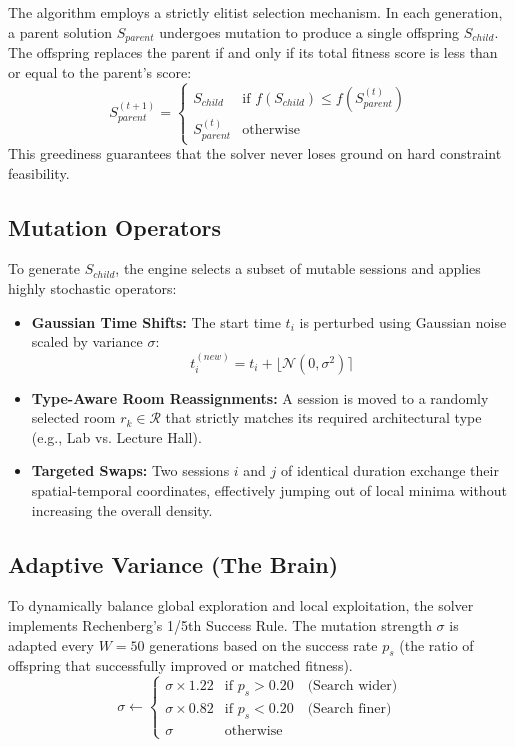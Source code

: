 The algorithm employs a strictly elitist selection mechanism. In each generation, a parent solution $S_{parent}$ undergoes mutation to produce a single offspring $S_{child}$. The offspring replaces the parent if and only if its total fitness score is less than or equal to the parent's score:
\begin{equation}
    S_{parent}^{(t+1)} = \begin{cases} 
      S_{child} & \text{if } f(S_{child}) \le f(S_{parent}^{(t)}) \\
      S_{parent}^{(t)} & \text{otherwise}
   \end{cases}
\end{equation}
This greediness guarantees that the solver never loses ground on hard constraint feasibility.

\subsection{Mutation Operators}

To generate $S_{child}$, the engine selects a subset of mutable sessions and applies highly stochastic operators:
\begin{itemize}
    \item \textbf{Gaussian Time Shifts:} The start time $t_i$ is perturbed using Gaussian noise scaled by variance $\sigma$:
    \begin{equation}
        t_i^{(new)} = t_i + \lfloor \mathcal{N}(0, \sigma^2) \rceil
    \end{equation}
    \item \textbf{Type-Aware Room Reassignments:} A session is moved to a randomly selected room $r_k \in \mathcal{R}$ that strictly matches its required architectural type (e.g., Lab vs. Lecture Hall).
    \item \textbf{Targeted Swaps:} Two sessions $i$ and $j$ of identical duration exchange their spatial-temporal coordinates, effectively jumping out of local minima without increasing the overall density.
\end{itemize}

\subsection{Adaptive Variance (The Brain)}

To dynamically balance global exploration and local exploitation, the solver implements Rechenberg's 1/5th Success Rule. The mutation strength $\sigma$ is adapted every $W = 50$ generations based on the success rate $p_s$ (the ratio of offspring that successfully improved or matched fitness).
\begin{equation}
    \sigma \leftarrow
    \begin{cases}
        \sigma \times 1.22 & \text{if } p_s > 0.20 \quad \text{(Search wider)} \\
        \sigma \times 0.82 & \text{if } p_s < 0.20 \quad \text{(Search finer)} \\
        \sigma & \text{otherwise}
    \end{cases}
\end{equation}

